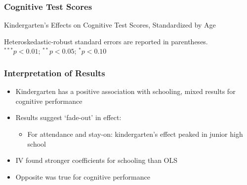 \documentclass{beamer}
\begin{document}
\begin{frame}
\frametitle{Cognitive Test Scores} 
\begin{adjustwidth}{-2em}{-2em}
\begin{table}
	\caption{Kindergarten's Effects on Cognitive Test Scores, Standardized by Age}
	\begin{threeparttable}
		{\tiny}
	\begin{tablenotes}
	\item {\tiny Heteroskedastic-robust standard errors are reported in parentheses. \\ $^{***}p<0.01$; $^{**}p<0.05$; $^{*}p<0.10$}
	\end{tablenotes} 
	\end{threeparttable}
\end{table}
\end{adjustwidth}
\end{frame}

\begin{frame}
\frametitle{Interpretation of Results}
\begin{itemize}
	\item Kindergarten has a positive association with schooling, mixed results for cognitive performance
	\vspace{0.1in}
	\item Results suggest `fade-out' in effect:
	\begin{itemize}
		\item For attendance and stay-on: kindergarten's effect peaked in junior high school 
	\end{itemize}
	\vspace{0.1in}
	\item IV found stronger coefficients for schooling than OLS 
	\vspace{0.1in}
	\item Opposite was true for cognitive performance
\end{itemize}
\end{frame}
\end{document}
